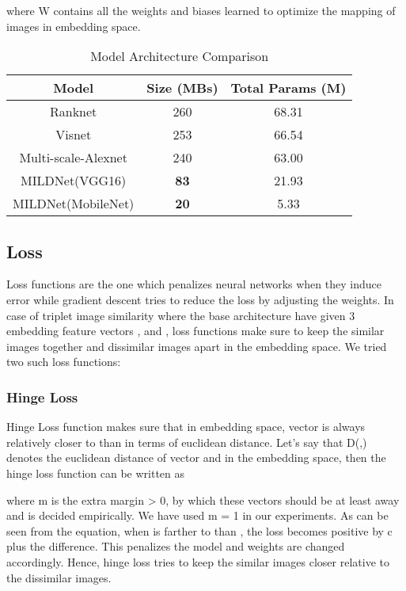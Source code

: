 \documentclass[10pt,twocolumn,letterpaper]{article}
\begin{document}
where W contains all the weights and biases learned to optimize the mapping of images in embedding space.

\begin{table}[h]
\caption{Model Architecture Comparison}
\label{model_arch_comparison}
\begin{center}
\begin{tabular}{|c||c|c|}
\hline
Model & Size (MBs) & Total Params (M)\\
\hline
\hline
Ranknet\cite{c3} & 260 & 68.31\\
\hline
Visnet\cite{c2} & 253 & 66.54\\
\hline
Multi-scale-Alexnet\cite{c1} & 240 & 63.00\\
\hline
MILDNet(VGG16) & \textbf{83} & 21.93\\
\hline
MILDNet(MobileNet) & \textbf{20} & 5.33\\
\hline
\end{tabular}
\end{center}
\end{table}

\subsection{Loss}
Loss functions are the one which penalizes neural networks when they induce error while gradient descent tries to reduce the loss by adjusting the weights. In case of triplet image similarity where the base architecture have given 3 embedding feature vectors ,  and , loss functions make sure to keep the similar images together and dissimilar images apart in the embedding space. We tried two such loss functions: 
\subsubsection{Hinge Loss}
Hinge Loss function makes sure that in embedding space, vector  is always relatively closer to  than  in terms of euclidean distance. Let's say that D(,) denotes the euclidean distance of vector  and  in the embedding space, then the hinge loss function can be written as

where m is the extra margin > 0, by which these vectors should be at least away and is decided empirically. We have used m = 1 in our experiments. 
As can be seen from the equation, when  is farther to  than , the loss becomes positive by c plus the difference. This penalizes the model and weights are changed accordingly. Hence, hinge loss tries to keep the similar images closer relative to the dissimilar images.
\end{document}
